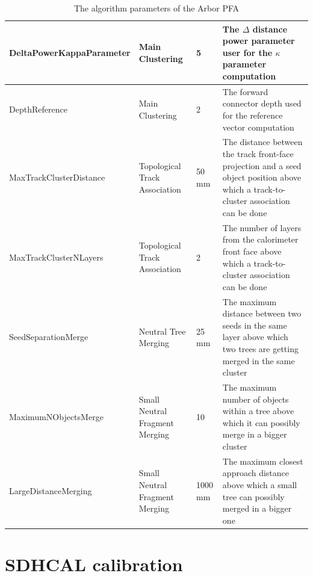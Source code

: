 \documentclass[cits]{JINST}
\begin{document}
\begin{center}
  \begin{table}[!ht]
    \begin{tabu} to \linewidth {| l | X | l | X |}
          \hline
          DeltaPowerKappaParameter & Main Clustering & 5 & The $\Delta$ distance power parameter user for the $\kappa$ parameter computation \\
          \hline
          DepthReference & Main Clustering & 2 & The forward connector depth used for the reference vector computation \\
          \hline
          MaxTrackClusterDistance & Topological Track Association & 50 mm & The distance between the track front-face projection and a seed object position above which a track-to-cluster association can be done \\
          \hline
          MaxTrackClusterNLayers & Topological Track Association & 2 & The number of layers from the calorimeter front face above which a track-to-cluster association can be done \\ 
          \hline
          SeedSeparationMerge & Neutral Tree Merging & 25 mm & The maximum distance between two seeds in the same layer above which two trees are getting merged in the same cluster \\ 
          \hline
          MaximumNObjectsMerge & Small Neutral Fragment Merging & 10 & The maximum number of objects within a tree above which it can possibly merge in a bigger cluster \\
          \hline
          LargeDistanceMerging & Small Neutral Fragment Merging & 1000 mm & The maximum closest approach distance above which a small tree can possibly merged in a bigger one \\
          \hline
          
    \end{tabu}
  \caption{The algorithm parameters of the Arbor PFA}
  \end{table}
\end{center}


\section{SDHCAL calibration}
\end{document}
